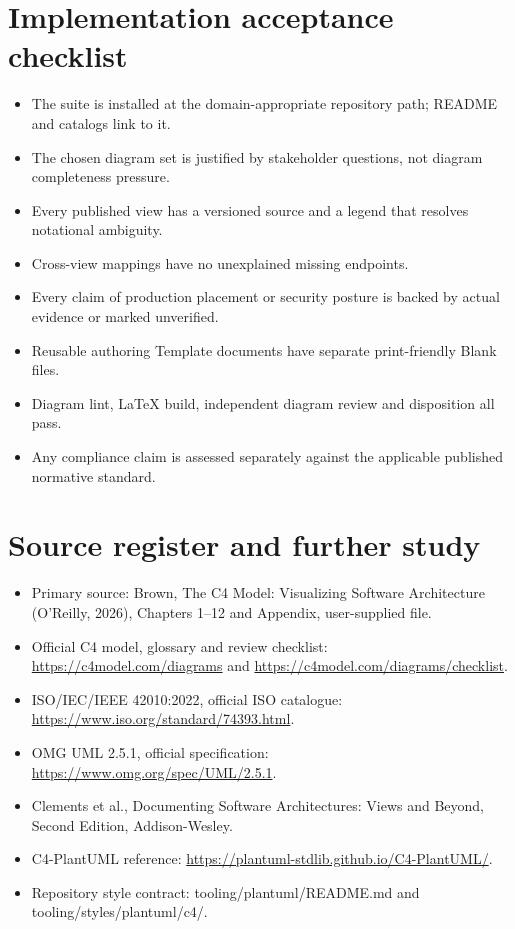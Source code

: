 \documentclass[10pt,letterpaper]{article}
\begin{document}
\section{Implementation acceptance checklist}
\begin{itemize}
\item The suite is installed at the domain-appropriate repository path; README and catalogs link to it.
\item The chosen diagram set is justified by stakeholder questions, not diagram completeness pressure.
\item Every published view has a versioned source and a legend that resolves notational ambiguity.
\item Cross-view mappings have no unexplained missing endpoints.
\item Every claim of production placement or security posture is backed by actual evidence or marked unverified.
\item Reusable authoring Template documents have separate print-friendly Blank files.
\item Diagram lint, LaTeX build, independent diagram review and disposition all pass.
\item Any compliance claim is assessed separately against the applicable published normative standard.
\end{itemize}
\section{Source register and further study}
\begin{itemize}
\item Primary source: Brown, The C4 Model: Visualizing Software Architecture (O’Reilly, 2026), Chapters 1–12 and Appendix, user-supplied file.
\item Official C4 model, glossary and review checklist: \url{https://c4model.com/diagrams} and \url{https://c4model.com/diagrams/checklist}.
\item ISO/IEC/IEEE 42010:2022, official ISO catalogue: \url{https://www.iso.org/standard/74393.html}.
\item OMG UML 2.5.1, official specification: \url{https://www.omg.org/spec/UML/2.5.1}.
\item Clements et al., Documenting Software Architectures: Views and Beyond, Second Edition, Addison-Wesley.
\item C4-PlantUML reference: \url{https://plantuml-stdlib.github.io/C4-PlantUML/}.
\item Repository style contract: tooling/plantuml/README.md and tooling/styles/plantuml/c4/.
\end{itemize}
\end{document}

